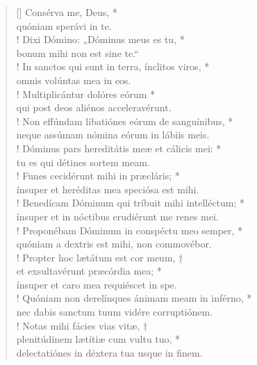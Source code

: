 \begin{verse}[\versewidth]
Consérva me, Deus, *\\
quóniam sperávi in te.\\!
\vin Dixi Dómino: „Dóminus meus es tu, *\\
\vin bonum mihi non est sine te.“\\!
In sanctos qui sunt in terra, ínclitos viros, *\\
omnis volúntas mea in eos.\\!
\vin Multiplicántur dolóres eórum *\\
\vin qui post deos aliénos acceleravérunt.\\!
Non effúndam libatiónes eórum de sanguínibus, *\\
neque assúmam nómina eórum in lábiis meis.\\!
\vin Dóminus pars hereditátis meæ et cálicis mei: *\\
\vin tu es qui détines sortem meam.\\!
Funes cecidérunt mihi in præcláris; *\\
ínsuper et heréditas mea speciósa est mihi.\\!
\vin Benedícam Dóminum qui tríbuit mihi intelléctum; *\\
\vin ínsuper et in nóctibus erudiérunt me renes mei.\\!
Proponébam Dóminum in conspéctu meo semper, *\\
quóniam a dextris est mihi, non commovébor.\\!
\vin Propter hoc lætátum est cor meum, †\\
\vin et exsultavérunt præcórdia mea; *\\
\vin ínsuper et caro mea requiéscet in spe.\\!
Quóniam non derelínques ánimam meam in inférno, *\\
nec dabis sanctum tuum vidére corruptiónem.\\!
\vin Notas mihi fácies vias vitæ, †\\
\vin plenitúdinem lætítiæ cum vultu tuo, *\\
\vin delectatiónes in déxtera tua usque in finem.\\
\end{verse}
\vspace{1cm}



